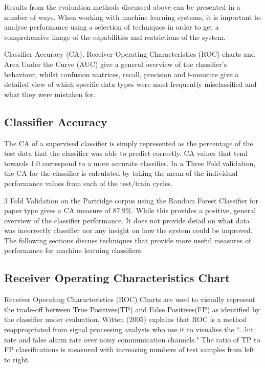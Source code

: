 Results from the evaluation methods discussed above can be presented in a
number of ways. When working with machine learning systems, it is important to
analyse performance using a selection of techniques in order to get a
comprehensive image of the capabilities and restrictions of the system.

Classifier Accuracy (CA), Receiver Operating Characteristics
(ROC) charts and Area Under the Curve (AUC) give a general overview of the
classifier's behaviour, whilst confusion matrices, recall, precision and
f-measure give a detailed view of which specific data types were most
frequently misclassified and what they were mistaken for. 

\subsection{ Classifier Accuracy } 

The CA of a supervised classifier is simply represented as the percentage of
the test data that the classifier was able to predict correctly. CA values that
tend towards 1.0 correspond to a more accurate classifier. In a Three Fold
validation, the CA for the classifier is calculated by taking the mean of the
individual performance values from each of the test/train cycles. 

3 Fold Validation on the Partridge corpus using the Random Forest Classifier
for paper type gives a CA measure of 87.9\%. While this provides a positive,
general overview of the classifier performance. It does not provide detail on
what data was incorrectly classifier nor any insight on how the system could be
improved. The following sections discuss techniques that provide more useful
measures of performance for machine learning classifiers.

\subsection{ Receiver Operating Characteristics Chart}

Receiver Operating Characteristics (ROC) Charts are used to visually represent
the trade-off between True Positives(TP) and False Positives(FP) as identified
by the classifier under evaluation. Witten (2005) explains that ROC is a method
reappropriated from signal processing analysts who use it to visualise the ``...hit
rate and false alarm rate over noisy communication
channels\cite{witten2005data}." The ratio of TP to FP classifications is
measured with increasing numbers of test samples from left to right. 

